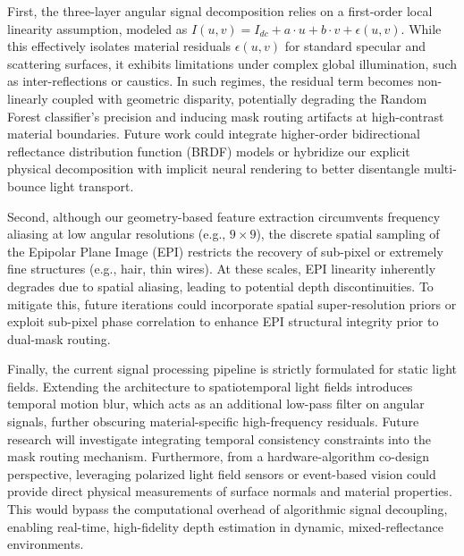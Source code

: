 First, the three-layer angular signal decomposition relies on a first-order local linearity assumption, modeled as $I(u,v) = I_{dc} + a \cdot u + b \cdot v + \epsilon(u,v)$. While this effectively isolates material residuals $\epsilon(u,v)$ for standard specular and scattering surfaces, it exhibits limitations under complex global illumination, such as inter-reflections or caustics. In such regimes, the residual term becomes non-linearly coupled with geometric disparity, potentially degrading the Random Forest classifier's precision and inducing mask routing artifacts at high-contrast material boundaries. Future work could integrate higher-order bidirectional reflectance distribution function (BRDF) models or hybridize our explicit physical decomposition with implicit neural rendering to better disentangle multi-bounce light transport.

Second, although our geometry-based feature extraction circumvents frequency aliasing at low angular resolutions (e.g., $9 \times 9$), the discrete spatial sampling of the Epipolar Plane Image (EPI) restricts the recovery of sub-pixel or extremely fine structures (e.g., hair, thin wires). At these scales, EPI linearity inherently degrades due to spatial aliasing, leading to potential depth discontinuities. To mitigate this, future iterations could incorporate spatial super-resolution priors or exploit sub-pixel phase correlation to enhance EPI structural integrity prior to dual-mask routing.

Finally, the current signal processing pipeline is strictly formulated for static light fields. Extending the architecture to spatiotemporal light fields introduces temporal motion blur, which acts as an additional low-pass filter on angular signals, further obscuring material-specific high-frequency residuals. Future research will investigate integrating temporal consistency constraints into the mask routing mechanism. Furthermore, from a hardware-algorithm co-design perspective, leveraging polarized light field sensors or event-based vision could provide direct physical measurements of surface normals and material properties. This would bypass the computational overhead of algorithmic signal decoupling, enabling real-time, high-fidelity depth estimation in dynamic, mixed-reflectance environments.